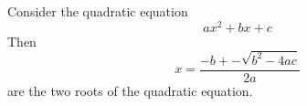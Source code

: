 \documentclass{article}
\begin{document}
  Consider the quadratic equation
  \begin{equation}
    a x^2 + b x + c
  \end{equation}
  Then 
  \begin{equation}
    \label{eq:quad}
    x = \frac{-b+-\sqrt{b^2-4ac}}{2a}
  \end{equation}
  are the two roots of the quadratic equation.
\end{document}
